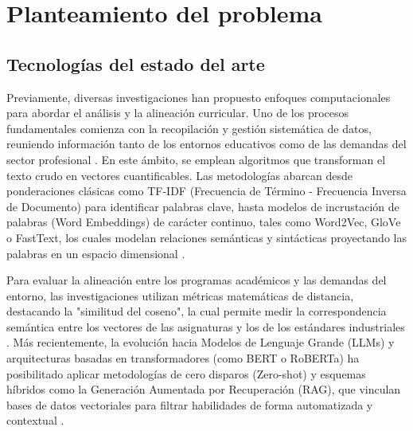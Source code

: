 
\chapter{Planteamiento del problema}
\label{cap:planteamiento}


\section{Tecnologías del estado del arte}
\label{cap:tecnologias}

Previamente, diversas investigaciones han propuesto enfoques computacionales para abordar el análisis y la alineación curricular. 
Uno de los procesos fundamentales comienza con la recopilación y gestión sistemática de datos, reuniendo información tanto de los entornos educativos como de las demandas del sector profesional \parencite{constantinov_preliminary_2015}. En este ámbito, se emplean algoritmos que transforman el texto crudo en vectores cuantificables. 
Las metodologías abarcan desde ponderaciones clásicas como TF-IDF (Frecuencia de Término - Frecuencia Inversa de Documento) para identificar palabras clave, 
hasta modelos de incrustación de palabras (Word Embeddings) de carácter continuo, tales como Word2Vec, GloVe o FastText, los cuales modelan relaciones semánticas y sintácticas proyectando las palabras en un espacio dimensional \parencite{naseem_comprehensive_2021}.


Para evaluar la alineación entre los programas académicos y las demandas del entorno, las investigaciones utilizan métricas matemáticas de distancia, destacando la "similitud del coseno", la cual permite medir la correspondencia semántica entre los vectores de las asignaturas y los de los estándares industriales \parencite{miura_automated_2021}. 
Más recientemente, la evolución hacia Modelos de Lenguaje Grande (LLMs) y arquitecturas basadas en transformadores (como BERT o RoBERTa) ha posibilitado aplicar metodologías de cero disparos (Zero-shot) y esquemas híbridos como la Generación Aumentada por Recuperación (RAG), que vinculan bases de datos vectoriales para filtrar habilidades de forma automatizada y contextual \parencite{cristea_course_2025}.

